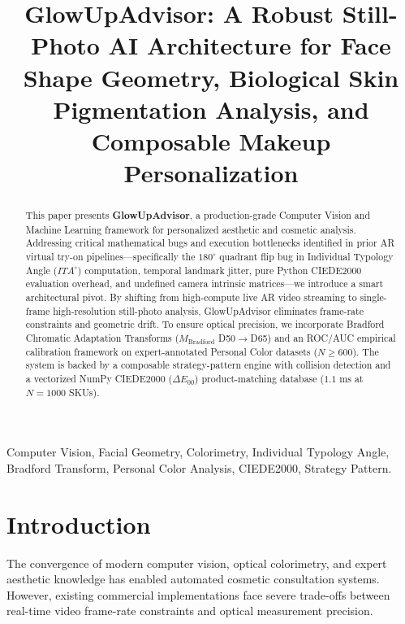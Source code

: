 \documentclass[conference]{IEEEtran}
\begin{document}
\title{GlowUpAdvisor: A Robust Still-Photo AI Architecture for Face Shape Geometry, Biological Skin Pigmentation Analysis, and Composable Makeup Personalization}

\author{
}

\maketitle

\begin{abstract}
This paper presents \textbf{GlowUpAdvisor}, a production-grade Computer Vision and Machine Learning framework for personalized aesthetic and cosmetic analysis. Addressing critical mathematical bugs and execution bottlenecks identified in prior AR virtual try-on pipelines—specifically the $180^\circ$ quadrant flip bug in Individual Typology Angle ($ITA^\circ$) computation, temporal landmark jitter, pure Python CIEDE2000 evaluation overhead, and undefined camera intrinsic matrices—we introduce a smart architectural pivot. By shifting from high-compute live AR video streaming to single-frame high-resolution still-photo analysis, GlowUpAdvisor eliminates frame-rate constraints and geometric drift. To ensure optical precision, we incorporate Bradford Chromatic Adaptation Transforms ($M_{\text{Bradford}}$ D50$\rightarrow$D65) and an ROC/AUC empirical calibration framework on expert-annotated Personal Color datasets ($N\ge600$). The system is backed by a composable strategy-pattern engine with collision detection and a vectorized NumPy CIEDE2000 ($\Delta E_{00}$) product-matching database ($1.1\text{ ms}$ at $N=1000$ SKUs).
\end{abstract}

\begin{IEEEkeywords}
Computer Vision, Facial Geometry, Colorimetry, Individual Typology Angle, Bradford Transform, Personal Color Analysis, CIEDE2000, Strategy Pattern.
\end{IEEEkeywords}

\section{Introduction}
The convergence of modern computer vision, optical colorimetry, and expert aesthetic knowledge has enabled automated cosmetic consultation systems. However, existing commercial implementations face severe trade-offs between real-time video frame-rate constraints and optical measurement precision.
\end{document}
